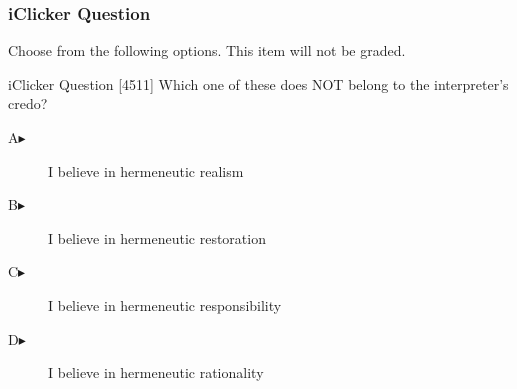 \begin{frame}
  \frametitle{iClicker Question}
Choose from the following options. This item will not be graded.
\begin{block}{iClicker Question}
[4511] Which one of these does NOT belong to the interpreter's credo?
\end{block}
\begin{description}
\item[A\hspace{.2in}$\blacktriangleright$] I believe in hermeneutic realism
\item[B\hspace{.2in}$\blacktriangleright$] I believe in hermeneutic restoration
\item[C\hspace{.2in}$\blacktriangleright$] I believe in hermeneutic responsibility
\item[D\hspace{.2in}$\blacktriangleright$] I believe in hermeneutic rationality
\end{description}
\end{frame}
